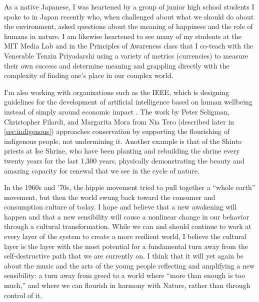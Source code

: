 As a native Japanese, I was heartened by a group of junior high school students I spoke to in Japan recently who, when challenged about what we should do about the environment, asked questions about the meaning of happiness and the role of humans in nature. I am likewise heartened to see many of my students at the MIT Media Lab and in the Principles of Awareness class that I co-teach with the Venerable Tenzin Priyadarshi using a variety of metrics (currencies) to measure their own success and determine meaning and grappling directly with the complexity of finding one's place in our complex world.

I'm also working with organizations such as the IEEE, which is designing guidelines for the development of artificial intelligence based on human wellbeing instead of simply around economic impact \cite{chatila2017ieee}. The work by Peter Seligman, Christopher Filardi, and Margarita Mora from Nia Tero \cite{NiaTero71:online} (described later in \autoref{sec:indigenous}) approaches conservation by supporting the flourishing of indigenous people, not undermining it. Another example is that of the Shinto priests at Ise Shrine, who have been planting and rebuilding the shrine every twenty years for the last 1,300 years, physically demonstrating the beauty and amazing capacity for renewal that we see in the cycle of nature.

In the 1960s and '70s, the hippie movement tried to pull together a ``whole earth'' movement, but then the world swung back toward the consumer and consumption culture of today. I hope and believe that a new awakening will happen and that a new sensibility will cause a nonlinear change in our behavior through a cultural transformation. While we can and should continue to work at every layer of the system to create a more resilient world, I believe the cultural layer is the layer with the most potential for a fundamental turn away from the self-destructive path that we are currently on. I think that it will yet again be about the music and the arts of the young people reflecting and amplifying a new sensibility: a turn away from greed to a world where ``more than enough is too much,'' and where we can flourish in harmony with Nature, rather than through control of it.


